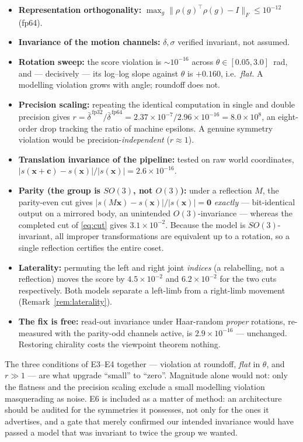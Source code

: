 \begin{itemize}
\item[E1] \textbf{Representation orthogonality:}
$\max_g\|\rho(g)^{\!\top}\rho(g)-I\|_F\le10^{-12}$ (fp64).
\item[E2] \textbf{Invariance of the motion channels:} $\delta,\sigma$ verified invariant, not assumed.
\item[E3] \textbf{Rotation sweep:} the score violation is $\sim\!10^{-16}$ across
$\theta\in[0.05,3.0]$~rad, and --- decisively --- its log--log slope against $\theta$ is $+0.160$,
i.e.\ \emph{flat}. A modelling violation grows with angle; roundoff does not.
\item[E4] \textbf{Precision scaling:} repeating the identical computation in single and double
precision gives
$r=\bar\delta^{\,\mathrm{fp32}}/\bar\delta^{\,\mathrm{fp64}}
=2.37\times10^{-7}/2.96\times10^{-16}=8.0\times10^{8}$,
an eight-order drop tracking the ratio of machine epsilons. A genuine symmetry violation would be
precision-\emph{independent} ($r\approx1$).
\item[E5] \textbf{Translation invariance of the pipeline:} tested on raw world coordinates,
$|s(\bm{x}+\bm{c})-s(\bm{x})|/|s(\bm{x})|=2.6\times10^{-16}$.
\item[E6] \textbf{Parity (the group is $SO(3)$, not $O(3)$):} under a reflection $M$, the
parity-even cut gives $|s(M\bm{x})-s(\bm{x})|/|s(\bm{x})|=\mathbf{0}$ \emph{exactly} --- bit-identical
output on a mirrored body, an unintended $O(3)$-invariance --- whereas the completed cut of
\eqref{eq:cut} gives $3.1\times10^{-2}$. Because the model is $SO(3)$-invariant, all improper
transformations are equivalent up to a rotation, so a single reflection certifies the entire coset.
\item[E7] \textbf{Laterality:} permuting the left and right joint \emph{indices} (a relabelling, not a
reflection) moves the score by $4.5\times10^{-2}$ and $6.2\times10^{-2}$ for the two cuts
respectively. Both models separate a left-limb from a right-limb movement
(Remark~\ref{rem:laterality}).
\item[E8] \textbf{The fix is free:} read-out invariance under Haar-random \emph{proper} rotations,
re-measured with the parity-odd channels active, is $2.9\times10^{-16}$ --- unchanged. Restoring
chirality costs the viewpoint theorem nothing.
\end{itemize}
%
The three conditions of E3--E4 together --- violation at roundoff, \emph{flat} in $\theta$, and
$r\gg1$ --- are what upgrade ``small'' to ``zero''. Magnitude alone would not: only the flatness and
the precision scaling exclude a small modelling violation masquerading as noise. E6 is included as a
matter of method: an architecture should be audited for the symmetries it possesses, not only for the
ones it advertises, and a gate that merely confirmed our intended invariance would have passed a model
that was invariant to twice the group we wanted.

